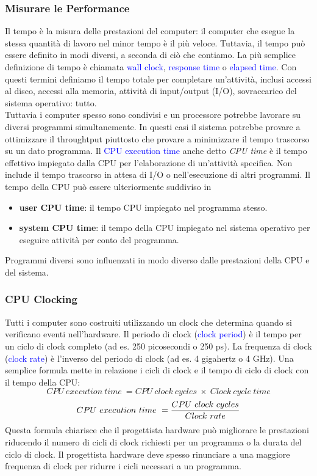 \documentclass[12pt,a4paper]{article}
\begin{document}
\subsubsection{Misurare le Performance}
Il tempo è la misura delle prestazioni del computer: il computer che esegue la stessa quantità di lavoro nel minor tempo è il più veloce. Tuttavia, il tempo può essere definito in modi diversi, a seconda di ciò che contiamo. La più semplice definizione di tempo è chiamata \textcolor{blue}{wall clock}, \textcolor{blue}{response time} o \textcolor{blue}{elapsed time}. Con questi termini definiamo il tempo totale per completare un'attività, inclusi accessi al disco, accessi alla memoria, attività di input/output (I/O), sovraccarico del sistema operativo: tutto.\\
Tuttavia i computer spesso sono condivisi e un processore potrebbe lavorare su diversi programmi simultanemente. In questi casi il sistema potrebbe provare a ottimizzare il throughtput piuttosto che provare a minimizzare il tempo trascorso su un dato programma. Il \textcolor{blue}{CPU execution time} anche detto \textsl{CPU time} è il tempo effettivo impiegato dalla CPU per l'elaborazione di un'attività specifica. Non include il tempo trascorso in attesa di I/O o nell'esecuzione di altri programmi. Il tempo della CPU può essere ulteriormente suddiviso in
\begin{itemize}
\item \textbf{user CPU time}: il tempo CPU impiegato nel programma stesso.
\item \textbf{system CPU time}: il tempo della CPU impiegato nel sistema operativo per eseguire attività per conto del programma.
\end{itemize}
Programmi diversi sono influenzati in modo diverso dalle prestazioni della CPU e del sistema.

\subsubsection{CPU Clocking}
Tutti i computer sono costruiti utilizzando un clock che determina quando si verificano eventi nell'hardware. Il periodo di clock (\textcolor{blue}{clock period}) è il tempo per un ciclo di clock completo (ad es. 250 picosecondi o 250 ps). La frequenza di clock (\textcolor{blue}{clock rate}) è l'inverso del periodo di clock (ad es. 4 gigahertz o 4 GHz).
Una semplice formula mette in relazione i cicli di clock e il tempo di ciclo di clock con il tempo della CPU:
$$CPU\ execution\ time\ = CPU\ clock\ cycles\ \times \ Clock\ cycle\ time$$
$$CPU\ execution\ time\ = {CPU\ clock\ cycles \over Clock\ rate}$$
Questa formula chiarisce che il progettista hardware può migliorare le prestazioni riducendo il numero di cicli di clock richiesti per un programma o la durata del ciclo di clock. Il progettista hardware deve spesso rinunciare a una maggiore frequenza di clock per ridurre i cicli necessari a un programma.
\end{document}
